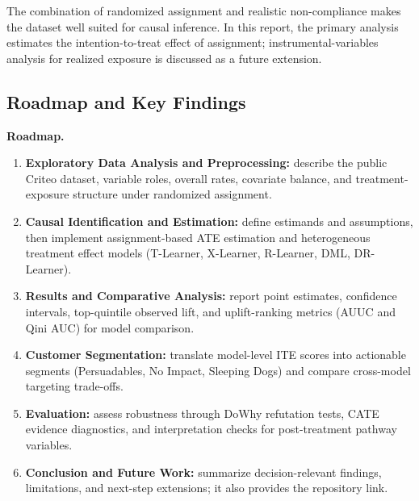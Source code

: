 \documentclass[journal,11pt,onecolumn]{IEEEtran}
\begin{document}
The combination of randomized assignment and realistic non-compliance makes the dataset well suited for causal inference. In this report, the primary analysis estimates the intention-to-treat effect of assignment; instrumental-variables analysis for realized exposure is discussed as a future extension.

\subsection{Roadmap and Key Findings}

\textbf{Roadmap.}
\begin{enumerate}
    \item \textbf{Exploratory Data Analysis and Preprocessing:} describe the public Criteo dataset, variable roles, overall rates, covariate balance, and treatment-exposure structure under randomized assignment.
    \item \textbf{Causal Identification and Estimation:} define estimands and assumptions, then implement assignment-based ATE estimation and heterogeneous treatment effect models (T-Learner, X-Learner, R-Learner, DML, DR-Learner).
    \item \textbf{Results and Comparative Analysis:} report point estimates, confidence intervals, top-quintile observed lift, and uplift-ranking metrics (AUUC and Qini AUC) for model comparison.
    \item \textbf{Customer Segmentation:} translate model-level ITE scores into actionable segments (Persuadables, No Impact, Sleeping Dogs) and compare cross-model targeting trade-offs.
    \item \textbf{Evaluation:} assess robustness through DoWhy refutation tests, CATE evidence diagnostics, and interpretation checks for post-treatment pathway variables.
    \item \textbf{Conclusion and Future Work:} summarize decision-relevant findings, limitations, and next-step extensions; it also provides the repository link.
\end{enumerate}
\end{document}
